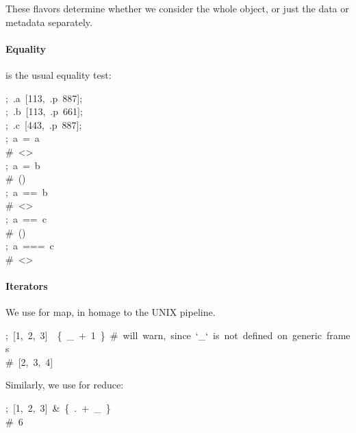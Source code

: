 \documentclass[preprint]{{sigplanconf}}
\begin{document}
These flavors determine whether we consider the whole object, or just the data
or metadata separately.%

\paragraph{Equality}\label{sec-equality}%

\noindent{}\mdcode{=} is the usual equality test:%
\begin{mdpre}%
\noindent;~.a~{}[{113},~.p~{887}];\\
;~.b~{}[{113},~.p~{661}];\\
;~.c~{}[{443},~.p~{887}];\\
;~a~=~a\\
{\#~\textless{}\textgreater{}}\\
;~a~=~b\\
{\#~()}\\
;~a~==~b\\
{\#~\textless{}\textgreater{}}\\
;~a~==~c\\
{\#~()}\\
;~a~===~c\\
{\#~\textless{}\textgreater{}}%
\end{mdpre}
\paragraph{Iterators}\label{sec-iterators}%

\noindent{}We use \mdcode{\textbar{}} for map, in homage to the UNIX pipeline.%
\begin{mdpre}%
\noindent;~{}[1,~2,~3]~\textbar{}~\{~\_~+~1~\}~{\#~will~warn,~since~`\_`~is~not~defined~on~generic~frames}\\
{\#~{}[2,~3,~4]}%
\end{mdpre}\noindent{}Similarly, we use \mdcode{\&} for reduce:
\begin{mdpre}%
\noindent;~{}[1,~2,~3]~\&~\{~.~+~\_~\}\\
{\#~6}%
\end{mdpre}
\end{document}
